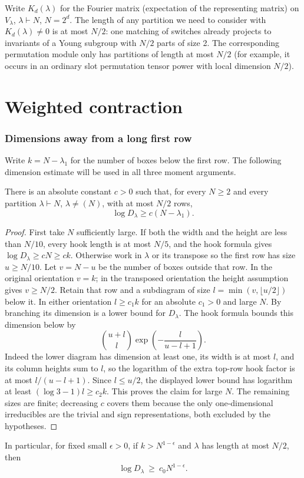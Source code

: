 Write \(K_d(\lambda)\) for the Fourier matrix (expectation of the representing matrix) on \(V_\lambda\), \(\lambda\vdash N\), \(N=2^d\). The length of any partition we need to consider with \(K_d(\lambda)\ne 0\) is at most \(N/2\): one matching of switches already projects to invariants of a Young subgroup with \(N/2\) parts of size 2. The corresponding permutation module only has partitions of length at most \(N/2\) (for example, it occurs in an ordinary slot permutation tensor power with local dimension \(N/2\)).


\part{Weighted contraction}\label{part:weighted}

\section{Dimensions away from a long first row}
\label{ten:weighted:part:53}
Write $k=N-\lambda_1$ for the number of boxes below the first row. The following dimension estimate will be used in all three moment arguments.
\begin{lemma}\label{lem:surviving-dimension}
There is an absolute constant $c>0$ such that, for every $N\ge2$ and every partition $\lambda\vdash N$, $\lambda\ne(N)$, with at most $N/2$ rows,
\[
 \log D_\lambda\ge c(N-\lambda_1).
\]
\end{lemma}
\begin{proof}
First take $N$ sufficiently large. If both the width and the height are less than $N/10$, every hook length is at most $N/5$, and the hook formula gives $\log D_\lambda\ge cN\ge ck$.
Otherwise work in $\lambda$ or its transpose so the first row has size $u\ge N/10$. Let $v=N-u$ be the number of boxes outside that row. In the original orientation $v=k$; in the transposed orientation the height assumption gives $v\ge N/2$. Retain that row and a subdiagram of size $l=\min(v,\lfloor u/2\rfloor)$ below it. In either orientation $l\ge c_1k$ for an absolute $c_1>0$ and large $N$. By branching its dimension is a lower bound for $D_\lambda$. The hook formula bounds this dimension below by
\[
 \binom{u+l}{l}\exp\!\left(-\frac{l}{u-l+1}\right).
\]
Indeed the lower diagram has dimension at least one, its width is at most $l$, and its column heights sum to $l$, so the logarithm of the extra top-row hook factor is at most $l/(u-l+1)$. Since $l\le u/2$, the displayed lower bound has logarithm at least $(\log3-1)l\ge c_2k$. This proves the claim for large $N$. The remaining sizes are finite; decreasing $c$ covers them because the only one-dimensional irreducibles are the trivial and sign representations, both excluded by the hypotheses.
\end{proof}
In particular, for fixed small \(\epsilon>0\), if \(k>N^{1-\epsilon}\) and \(\lambda\) has length at most \(N/2\), then
\begin{equation}
 \log D_\lambda \ \ge\ c_0 N^{1-\epsilon}.                                                  \label{ten:weighted:eq:3}
\end{equation}


